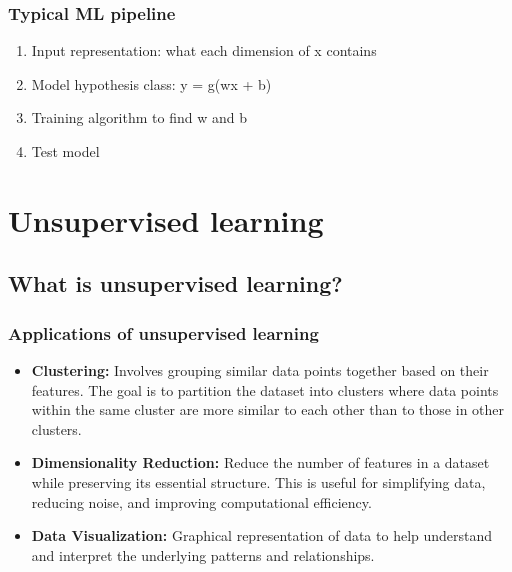 \documentclass{article}
\begin{document}
        \subsubsection{Typical ML pipeline}
            \begin{process}
                \begin{enumerate}
                    \item Input representation: what each dimension of x contains
                    \item Model hypothesis class: y = g(wx + b)
                    \item Training algorithm to find w and b
                    \item Test model
                \end{enumerate}
            \end{process}

\section{Unsupervised learning}
    \subsection{What is unsupervised learning?}
        \subsubsection{Applications of unsupervised learning}
            \begin{definition}
                \begin{itemize}
                    \item \textbf{Clustering:} Involves grouping similar data points together based on their features. The goal is to partition the dataset into clusters where data points within the same cluster are more similar to each other than to those in other clusters.
                    \item \textbf{Dimensionality Reduction:} Reduce the number of features in a dataset while preserving its essential structure. This is useful for simplifying data, reducing noise, and improving computational efficiency. 
                    \item \textbf{Data Visualization:} Graphical representation of data to help understand and interpret the underlying patterns and relationships. 
                \end{itemize}
            \end{definition}
\end{document}
